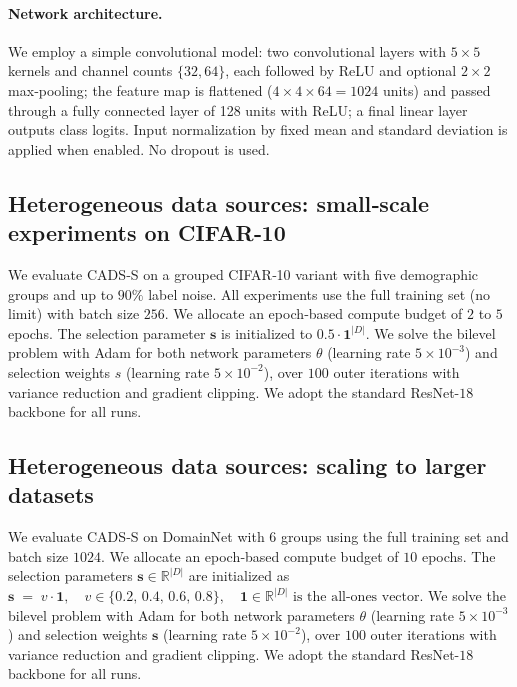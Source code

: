 \paragraph{Network architecture.}  
We employ a simple convolutional model: two convolutional layers with $5\times5$ kernels and channel counts $\{32,64\}$, each followed by ReLU and optional $2\times2$ max‐pooling; the feature map is flattened ($4\times4\times64=1024$ units) and passed through a fully connected layer of 128 units with ReLU; a final linear layer outputs class logits. Input normalization by fixed mean and standard deviation is applied when enabled. No dropout is used.  

\subsection{Heterogeneous data sources: small‐scale experiments on CIFAR‐10}  
\label{appendix:heterogeneous-cifar10}  
We evaluate CADS‐S on a grouped CIFAR‐10 variant with five demographic groups and up to $90\%$ label noise. All experiments use the full training set (no limit) with batch size $256$. We allocate an epoch‐based compute budget of $2$ to $5$ epochs. The selection parameter $\bm{s}$ is initialized to $0.5\cdot \bm{1}^{|D|}$. We solve the bilevel problem with Adam for both network parameters $\theta$ (learning rate $5\times10^{-3}$) and selection weights $s$ (learning rate $5\times10^{-2}$), over $100$ outer iterations with variance reduction and gradient clipping. We adopt the standard ResNet-$18$ backbone for all runs.
\subsection{Heterogeneous data sources: scaling to larger datasets}
\label{appendix:heterogeneous-domainnet}

We evaluate CADS‐S on DomainNet with \(6\) groups using the full training set and batch size \(1024\). We allocate an epoch‐based compute budget of \(10\) epochs. The selection parameters $\bm{s}\in\mathbb{R}^{|D|}$ are initialized as  
\(
\bm{s} \;=\; v \cdot \bm{1}, 
\quad v \in \{0.2,\,0.4,\,0.6,\,0.8\},
\quad \bm{1}\in\mathbb{R}^{|D|} \text{ is the all-ones vector}.
\) We solve the bilevel problem with Adam for both network parameters \(\theta\) (learning rate \(5\times10^{-3}\)) and selection weights $\bm{s}$ (learning rate \(5\times10^{-2}\)), over \(100\) outer iterations with variance reduction and gradient clipping. We adopt the standard ResNet-\(18\) backbone for all runs.

